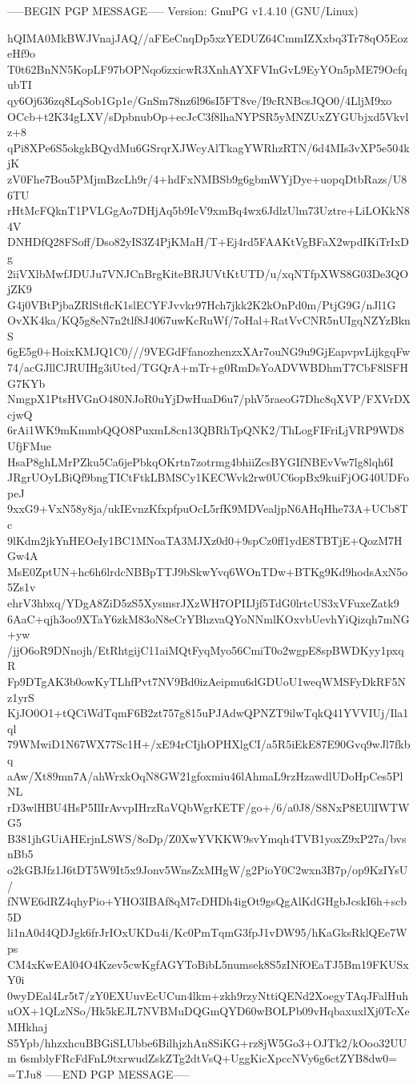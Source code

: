 -----BEGIN PGP MESSAGE-----
Version: GnuPG v1.4.10 (GNU/Linux)

hQIMA0MkBWJVnajJAQ//aFEeCnqDp5xzYEDUZ64CmmIZXxbq3Tr78qO5EozeHf9o
T0t62BnNN5KopLF97bOPNqo6zxicwR3XnhAYXFVInGvL9EyYOn5pME79OcfqubTI
qy6Oj636zq8LqSob1Gp1e/GnSm78nz6l96sI5FT8ve/I9cRNBcsJQO0/4LljM9xo
OCcb+t2K34gLXV/sDpbnubOp+ecJcC3f8lhaNYPSR5yMNZUxZYGUbjxd5Vkvlz+8
qPi8XPe6S5okgkBQydMu6GSrqrXJWcyAlTkagYWRhzRTN/6d4MIs3vXP5e504kjK
zV0Fhe7Bou5PMjmBzcLh9r/4+hdFxNMBSb9g6gbmWYjDye+uopqDtbRazs/U86TU
rHtMcFQknT1PVLGgAo7DHjAq5b9IcV9xmBq4wx6JdlzUlm73Uztre+LiLOKkN84V
DNHDfQ28FSoff/Dso82yIS3Z4PjKMaH/T+Ej4rd5FAAKtVgBFaX2wpdIKiTrIxDg
2iiVXlbMwfJDUJu7VNJCnBrgKiteBRJUVtKtUTD/u/xqNTfpXWS8G03De3QOjZK9
G4j0VBtPjbaZRlStflcK1slECYFJvvkr97Hch7jkk2K2kOnPd0m/PtjG9G/nJl1G
OvXK4ka/KQ5g8eN7n2tlf8J4067uwKcRuWf/7oHal+RatVvCNR5nUIgqNZYzBknS
6gE5g0+HoixKMJQ1C0///9VEGdFfanozhenzxXAr7ouNG9u9GjEapvpvLijkgqFw
74/acGJllCJRUIHg3iUted/TGQrA+mTr+g0RmDsYoADVWBDhmT7CbF8lSFHG7KYb
NmgpX1PtsHVGnO480NJoR0uYjDwHuaD6u7/phV5raeoG7Dhc8qXVP/FXVrDXcjwQ
6rAi1WK9mKmmbQQO8PuxmL8cn13QBRhTpQNK2/ThLogFIFriLjVRP9WD8UfjFMue
HsaP8ghLMrPZku5Ca6jePbkqOKrtn7zotrmg4bhiiZcsBYGIfNBEvVw7lg8lqh6I
JRgrUOyLBiQf9bngTICtFtkLBMSCy1KECWvk2rw0UC6opBx9kuiFjOG40UDFopeJ
9xxG9+VxN58y8ja/ukIEvnzKfxpfpuOcL5rfK9MDVealjpN6AHqHhe73A+UCb8Tc
9lKdm2jkYnHEOeIy1BC1MNoaTA3MJXz0d0+9spCz0ff1ydE8TBTjE+QozM7HGw4A
MsE0ZptUN+hc6h6lrdcNBBpTTJ9bSkwYvq6WOnTDw+BTKg9Kd9hodsAxN5o5Zs1v
ehrV3hbxq/YDgA8ZiD5zS5XysmsrJXzWH7OPIIJjf5TdG0lrtcUS3xVFuxeZatk9
6AaC+qjh3oo9XTaY6zkM83oN8eCrYBhzvaQYoNNmlKOxvbUevhYiQizqh7mNG+yw
/jjO6oR9DNnojh/EtRhtgijC11aiMQtFyqMyo56CmiT0o2wgpE8spBWDKyy1pxqR
Fp9DTgAK3b0owKyTLhfPvt7NV9Bd0izAeipmu6dGDUoU1weqWMSFyDkRF5Nz1yrS
KjJO0O1+tQCiWdTqmF6B2zt757g815uPJAdwQPNZT9ilwTqkQ41YVVIUj/Ila1ql
79WMwiD1N67WX77Sc1H+/xE94rCIjhOPHXlgCI/a5R5iEkE87E90Gvq9wJl7fkbq
aAw/Xt89mn7A/ahWrxkOqN8GW21gfoxmiu46lAhmaL9rzHzawdlUDoHpCes5PlNL
rD3wlHBU4HsP5IlIrAvvpIHrzRaVQbWgrKETF/go+/6/a0J8/S8NxP8EUlIWTWG5
B381jhGUiAHErjnLSWS/8oDp/Z0XwYVKKW9svYmqh4TVB1yoxZ9xP27a/bvsnBb5
o2kGBJfz1J6tDT5W9It5x9Jonv5WnsZxMHgW/g2PioY0C2wxn3B7p/op9KzIYsU/
fNWE6dRZ4qhyPio+YHO3IBAf8qM7cDHDh4igOt9gsQgAlKdGHgbJcskI6h+scb5D
li1nA0d4QDJgk6frJrIOxUKDu4i/Kc0PmTqmG3fpJ1vDW95/hKaGksRklQEe7Wps
CM4xKwEAl04O4Kzev5cwKgfAGYToBibL5numsek8S5zINfOEaTJ5Bm19FKUSxY0i
0wyDEal4Lr5t7/zY0EXUuvEcUCun4lkm+zkh9rzyNttiQENd2XoegyTAqJFalHuh
uOX+1QLzNSo/Hk5kEJL7NVBMuDQGmQYD60wBOLPb09vHqbaxuxlXj0TcXeMHkhaj
S5Ypb/hhzxhcuBBGiSLUbbe6BilhjzhAn8SiKG+rz8jW5Go3+OJTk2/kOoo32UUm
6smblyFRcFdFnL9txrwudZskZTg2dtVsQ+UggKicXpccNVy6g6ctZYB8dw0=
=TJu8
-----END PGP MESSAGE-----
